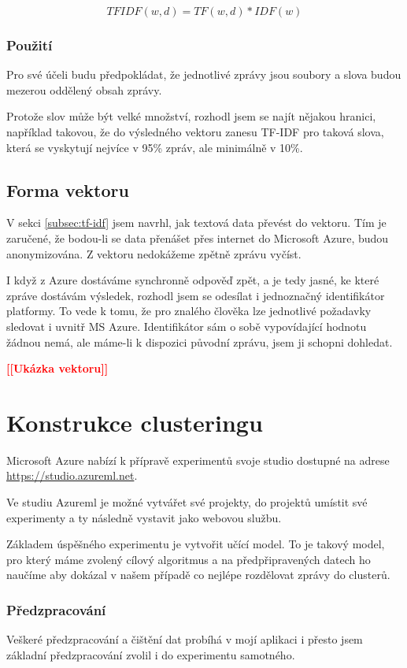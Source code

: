 \documentclass[thesis=M,czech]{FITthesis}[2012/10/20]
\newcommand{\todo}[1]{\textcolor{red}{\textbf{[[#1]]}}}
\begin{document}
		$$TFIDF(w,d) = TF(w,d) * IDF(w) $$
		
		\subsubsection{Použití}
		Pro své účeli budu předpokládat, že jednotlivé zprávy jsou soubory a slova budou mezerou oddělený obsah zprávy. 
		
		Protože slov může být velké množství, rozhodl jsem se najít nějakou hranici, například takovou, že do výsledného vektoru zanesu TF-IDF pro taková slova, která se vyskytují nejvíce v 95\% zpráv, ale minimálně v 10\%.
		
		\subsection{Forma vektoru}
		V sekci \ref{subsec:tf-idf} jsem navrhl, jak textová data převést do vektoru. Tím je zaručené, že bodou-li se data přenášet přes internet do Microsoft Azure, budou anonymizována. Z vektoru nedokážeme zpětně zprávu vyčíst.
		
		I když z Azure dostáváme synchronně odpověď zpět, a je tedy jasné, ke které zpráve dostávám výsledek, rozhodl jsem se odesílat i jednoznačný identifikátor platformy. To vede k tomu, že pro znalého člověka lze jednotlivé požadavky sledovat i uvnitř MS Azure. Identifikátor sám o sobě vypovídající hodnotu žádnou nemá, ale máme-li k dispozici původní zprávu, jsem ji schopni dohledat.
		
		\todo{Ukázka vektoru}
		
	\section{Konstrukce clusteringu}
		\label{sec:construc_clustering}
		Microsoft Azure nabízí k přípravě experimentů svoje studio dostupné na adrese \url{https://studio.azureml.net}.
		
		Ve studiu Azureml je možné vytvářet své projekty, do projektů umístit své experimenty a ty následně vystavit jako webovou službu.
		
		Základem úspěšného experimentu je vytvořit učící model. To je takový model, pro který máme zvolený cílový algoritmus a na předpřipravených datech ho naučíme aby dokázal v našem případě co nejlépe rozdělovat zprávy do clusterů.
		
		\subsubsection{Předzpracování}
		Veškeré předzpracování a čištění dat probíhá v mojí aplikaci i přesto jsem základní předzpracování zvolil i do experimentu samotného.
		
\end{document}
